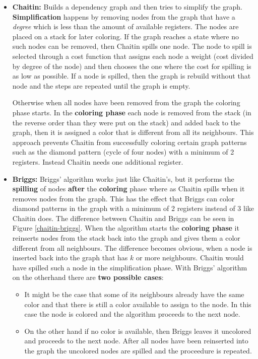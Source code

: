 \documentclass[a4paper,10pt]{article}
\begin{document}
\begin{itemize}
 \item \textbf{Chaitin:} Builds a dependency graph and then tries to simplify the graph. \textbf{Simplification} happens by removing nodes 
       from the graph that have a \textit{degree} which is less than the amount of available registers. The nodes are placed on a stack 
       for later coloring. If the graph reaches a state where no such nodes can be removed, then Chaitin spills one node. The node to 
       spill is selected through a cost function that assigns each node a weight (cost divided by degree of the node) and then chooses the 
       one where the cost for spilling is as low as possible. If a node is spilled, then the graph is rebuild without that node and the 
       steps are repeated until the graph is empty. 

       Otherwise when all nodes have been removed from the graph the coloring phase starts. In the \textbf{coloring phase} each node is 
       removed from the stack (in the reverse order than they were put on the stack) and added back to the graph, then it is assigned a 
       color that is different from all its neighbours. This approach prevents Chaitin from successfully coloring certain graph patterns 
       such as the diamond pattern (cycle of four nodes) with a minimum of 2 registers. Instead Chaitin needs one additional register.

 \item \textbf{Briggs:} Briggs' algorithm works just like Chaitin's, but it performs the \textbf{spilling} of nodes \textbf{after} the 
       \textbf{coloring} phase where as Chaitin spills when it removes nodes from the graph. This has the effect that Briggs can color 
       diamond patterns in the graph with a minimum of 2 registers instead of 3 like Chaitin does. The difference between Chaitin and 
       Briggs can be seen in Figure \ref{chaitin-briggs}. When the algorithm starts the \textbf{coloring phase} it reinserts nodes from 
       the stack back into the graph and gives them a color different from all neighbours. The difference becomes obvious, when a node is 
       inserted back into the graph that has $k$ or more neighbours. Chaitin would have spilled such a node in the simplification phase. 
       With Briggs' algorithm on the otherhand there are \textbf{two possible cases}:
	    \begin{itemize} 
		\item It might be the case that some of its neighbours already have the same color and that there is still a color     
		      available to assign to the node. In this case the node is colored and the algorithm proceeds to the next node.
		\item On the other hand if no color is available, then Briggs leaves it uncolored and proceeds to the next node. After
                      all nodes have been reinserted into the graph the uncolored nodes are spilled and the proceedure is repeated.
	    \end{itemize}


\end{itemize}
\end{document}
